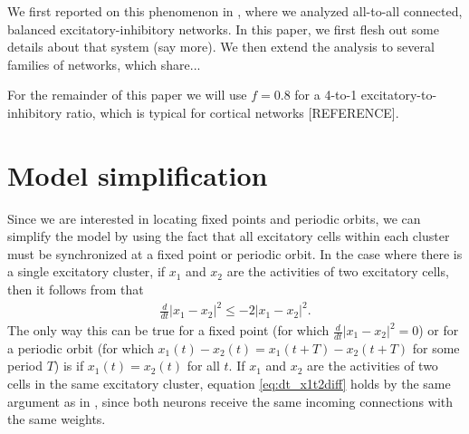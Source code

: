 \documentclass[11pt,reqno]{amsart}
\begin{document}
We first reported on this phenomenon in \cite{Barreiro2017}, where we analyzed all-to-all connected, balanced excitatory-inhibitory networks. In this paper, we first flesh out some details about that system (say more). We then extend the analysis to several families of networks, which share...

For the remainder of this paper we will use $f = 0.8$ for a 4-to-1 excitatory-to-inhibitory ratio, which is typical for cortical networks [REFERENCE].

\section{Model simplification}

Since we are interested in locating fixed points and periodic orbits, we can simplify the model by using the fact that all excitatory cells within each cluster must be synchronized at a fixed point or periodic orbit. In the case where there is a single excitatory cluster, if $x_1$ and $x_2$ are the activities of two excitatory cells, then it follows from \cite{Barreiro2017} that
\begin{align}\label{eq:dt_x1t2diff}
\frac{d}{dt}|x_1 - x_2|^2 \leq -2 |x_1 - x_2 |^2.
\end{align}
The only way this can be true for a fixed point (for which $\frac{d}{dt} |x_1 - x_2|^2 =0$) or for a periodic orbit (for which $x_1(t)-x_2(t) = x_1(t+T)-x_2(t+T)$ for some period $T$) is if $x_1(t) = x_2(t)$ for all $t$. If $x_1$ and $x_2$ are the activities of two cells in the same excitatory cluster, equation \cref{eq:dt_x1t2diff} holds by the same argument as in \cite{Barreiro2017}, since both neurons receive the same incoming connections with the same weights. 
\end{document}
